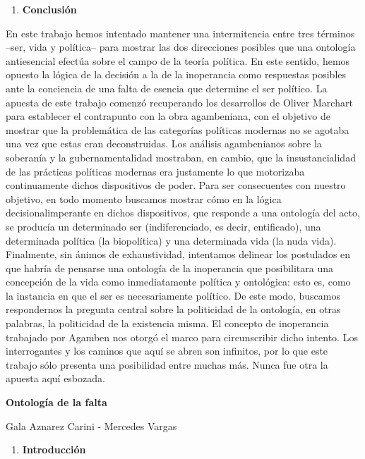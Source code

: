\documentclass{book}
\begin{document}
\begin{enumerate}
\def\labelenumi{\arabic{enumi}.}
\setcounter{enumi}{4}
\item
  \textbf{Conclusión}
\end{enumerate}

En este trabajo hemos intentado mantener una intermitencia entre tres
términos --ser, vida y política-- para mostrar las dos direcciones
posibles que una ontología antiesencial efectúa sobre el campo de la
teoría política. En este sentido, hemos opuesto la lógica de la decisión
a la de la inoperancia como respuestas posibles ante la conciencia de
una falta de esencia que determine el ser político. La apuesta de este
trabajo comenzó recuperando los desarrollos de Oliver Marchart para
establecer el contrapunto con la obra agambeniana, con el objetivo de
mostrar que la problemática de las categorías políticas modernas no se
agotaba una vez que estas eran deconstruidas. Los análisis agambenianos
sobre la soberanía y la gubernamentalidad mostraban, en cambio, que la
insustancialidad de las prácticas políticas modernas era justamente lo
que motorizaba continuamente dichos dispositivos de poder. Para ser
consecuentes con nuestro objetivo, en todo momento buscamos mostrar cómo
en la lógica decisionalimperante en dichos dispositivos, que responde a
una ontología del acto, se producía un determinado ser (indiferenciado,
es decir, entificado), una determinada política (la biopolítica) y una
determinada vida (la nuda vida). Finalmente, sin ánimos de
exhaustividad, intentamos delinear los postulados en que habría de
pensarse una ontología de la inoperancia que posibilitara una concepción
de la vida como inmediatamente política y ontológica: esto es, como la
instancia en que el ser es necesariamente político. De este modo,
buscamos respondernos la pregunta central sobre la politicidad de la
ontología, en otras palabras, la politicidad de la existencia misma. El
concepto de inoperancia trabajado por Agamben nos otorgó el marco para
circunscribir dicho intento. Los interrogantes y los caminos que aquí se
abren son infinitos, por lo que este trabajo sólo presenta una
posibilidad entre muchas más. Nunca fue otra la apuesta aquí esbozada.

\textbf{Ontología de la falta}

Gala Aznarez Carini - Mercedes Vargas

\begin{enumerate}
\def\labelenumi{\arabic{enumi}.}
\item
  \textbf{Introducción}
\end{enumerate}
\end{document}
